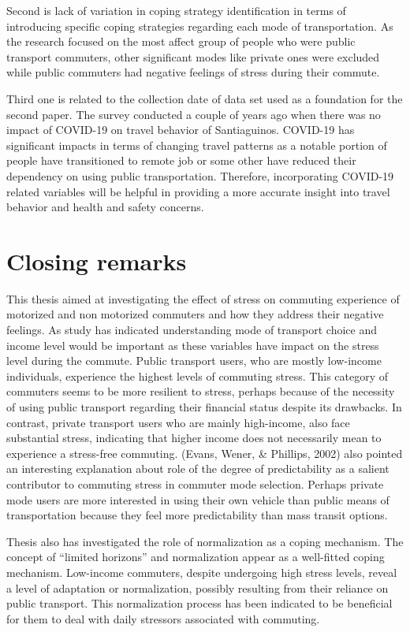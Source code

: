 \documentclass[
11pt, %
oneside, %
english, %
singlespacing, %
]{macthesis} %
\begin{document}
Second is lack of variation in coping strategy identification in terms of introducing specific coping strategies regarding each mode of transportation. As the research focused on the most affect group of people who were public transport commuters, other significant modes like private ones were excluded while public commuters had negative feelings of stress during their commute.

Third one is related to the collection date of data set used as a foundation for the second paper. The survey conducted a couple of years ago when there was no impact of COVID-19 on travel behavior of Santiaguinos. COVID-19 has significant impacts in terms of changing travel patterns as a notable portion of people have transitioned to remote job or some other have reduced their dependency on using public transportation. Therefore, incorporating COVID-19 related variables will be helpful in providing a more accurate insight into travel behavior and health and safety concerns.

\hypertarget{closing-remarks}{%
\section{Closing remarks}\label{closing-remarks}}

This thesis aimed at investigating the effect of stress on commuting experience of motorized and non motorized commuters and how they address their negative feelings. As study has indicated understanding mode of transport choice and income level would be important as these variables have impact on the stress level during the commute. Public transport users, who are mostly low-income individuals, experience the highest levels of commuting stress. This category of commuters seems to be more resilient to stress, perhaps because of the necessity of using public transport regarding their financial status despite its drawbacks. In contrast, private transport users who are mainly high-income, also face substantial stress, indicating that higher income does not necessarily mean to experience a stress-free commuting. (Evans, Wener, \& Phillips, 2002) also pointed an interesting explanation about role of the degree of predictability as a salient contributor to commuting stress in commuter mode selection. Perhaps private mode users are more interested in using their own vehicle than public means of transportation because they feel more predictability than mass transit options.

Thesis also has investigated the role of normalization as a coping mechanism. The concept of ``limited horizons'' and normalization appear as a well-fitted coping mechanism. Low-income commuters, despite undergoing high stress levels, reveal a level of adaptation or normalization, possibly resulting from their reliance on public transport. This normalization process has been indicated to be beneficial for them to deal with daily stressors associated with commuting.
\end{document}
